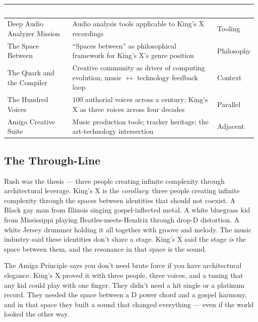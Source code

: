 \documentclass[11pt,letterpaper]{article}
\newcommand{\tableheader}[1]{\textbf{\sffamily\textcolor{white}{#1}}}
\begin{document}
\begin{center}
\begin{tabularx}{\textwidth}{L{4cm}XC{2.5cm}}
\toprule
{}
\tableheader{Document} & \tableheader{Relationship} & \tableheader{Type} \\
\midrule
Deep Audio Analyzer Mission & Audio analysis tools applicable to King's X recordings & Tooling \\
The Space Between & ``Spaces between'' as philosophical framework for King's X's genre position & Philosophy \\
The Quark and the Compiler & Creative community as driver of computing evolution; music $\leftrightarrow$ technology feedback loop & Context \\
The Hundred Voices & 100 authorial voices across a century; King's X as three voices across four decades & Parallel \\
Amiga Creative Suite & Music production tools; tracker heritage; the art-technology intersection & Adjacent \\
\bottomrule
\end{tabularx}
\end{center}

\subsection{The Through-Line}

Rush was the thesis --- three people creating infinite complexity through architectural leverage. King's X is the \textit{corollary}: three people creating infinite complexity through the spaces between identities that should not coexist. A Black gay man from Illinois singing gospel-inflected metal. A white bluegrass kid from Mississippi playing Beatles-meets-Hendrix through drop-D distortion. A white Jersey drummer holding it all together with groove and melody. The music industry said these identities don't share a stage. King's X said the stage \textit{is} the space between them, and the resonance in that space is the sound.

The Amiga Principle says you don't need brute force if you have architectural elegance. King's X proved it with three people, three voices, and a tuning that any kid could play with one finger. They didn't need a hit single or a platinum record. They needed the space between a D power chord and a gospel harmony, and in that space they built a sound that changed everything --- even if the world looked the other way.
\end{document}
